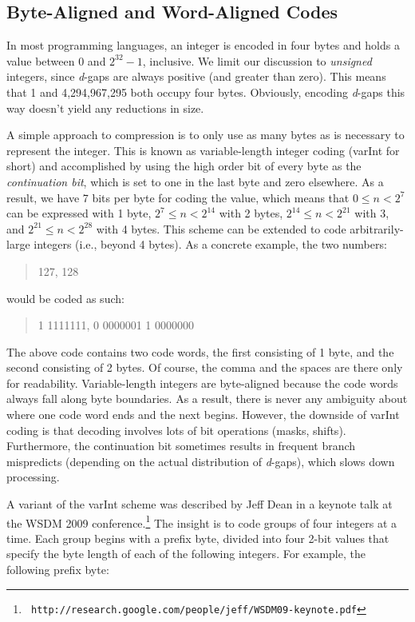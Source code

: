 \subsection{Byte-Aligned and Word-Aligned Codes}

In most programming languages, an integer is encoded in four bytes and
holds a value between 0 and $2^{32}-1$, inclusive. We limit our
discussion to \emph{unsigned} integers, since \emph{d}-gaps are always
positive (and greater than zero).  This means that 1 and 4,294,967,295
both occupy four bytes.  Obviously, encoding \emph{d}-gaps this way
doesn't yield any reductions in size.

A simple approach to compression is to only use as many bytes as is
necessary to represent the integer.  This is known as variable-length
integer coding (varInt for short) and accomplished by using the high
order bit of every byte as the \emph{continuation bit}, which is set to
one in the last byte and zero elsewhere.  As a result, we have 7 bits
per byte for coding the value, which means that $0 \leq n < 2^7$ can
be expressed with 1 byte, $2^{7} \leq n < 2^{14}$ with 2 bytes,
$2^{14} \leq n < 2^{21}$ with 3, and $2^{21} \leq n < 2^{28}$ with 4
bytes.  This scheme can be extended to code arbitrarily-large integers
(i.e., beyond 4 bytes).  As a concrete example, the two numbers:

\begin{quote}
127, 128
\end{quote}

\noindent would be coded as such:

\begin{quote}
1 1111111, 0 0000001 1 0000000
\end{quote}

\noindent The above code contains two code words, the first consisting
of 1 byte, and the second consisting of 2 bytes.  Of course, the comma
and the spaces are there only for readability.  Variable-length
integers are byte-aligned because the code words always fall along
byte boundaries.  As a result, there is never any ambiguity about
where one code word ends and the next begins.  However, the downside
of varInt coding is that decoding involves lots of bit operations
(masks, shifts).  Furthermore, the continuation bit sometimes results
in frequent branch mispredicts (depending on the actual distribution
of \emph{d}-gaps), which slows down processing.

A variant of the varInt scheme was described by Jeff Dean in a keynote
talk at the WSDM 2009 conference.\footnote{\texttt{
  http://research.google.com/people/jeff/WSDM09-keynote.pdf}} The
insight is to code groups of four integers at a time.  Each group
begins with a prefix byte, divided into four 2-bit values that specify
the byte length of each of the following integers.  For example, the
following prefix byte:

